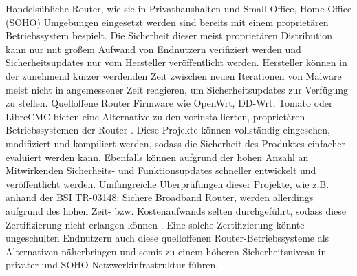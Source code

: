 \documentclass[a4paper]{book}
\begin{document}
\begin{large}
\begin{onehalfspace}
\newline\indent Handelsübliche Router, wie sie in Privathaushalten und Small Office, Home Office (SOHO) Umgebungen eingesetzt werden sind bereits mit einem proprietären Betriebssystem bespielt. Die Sicherheit dieser meist proprietären Distribution kann nur mit großem Aufwand von Endnutzern verifiziert werden und Sicherheitsupdates nur vom Hersteller veröffentlicht werden. Hersteller können in der zunehmend kürzer werdenden Zeit zwischen neuen Iterationen von Malware meist nicht in angemessener Zeit reagieren, um Sicherheitsupdates zur Verfügung zu stellen. Quelloffene Router Firmware wie OpenWrt, DD-Wrt, Tomato oder \mbox LibreCMC bieten eine Alternative zu den vorinstallierten, proprietären Betriebssystemen der Router \cite{OpenWrtWebseite.,DDWRTWebseite.,AdvancedTomatoWebseite.,libreCMCWebseite.}. Diese Projekte können vollständig eingesehen, modifiziert und kompiliert werden, sodass die Sicherheit des Produktes einfacher evaluiert werden kann. Ebenfalls können aufgrund der hohen Anzahl an Mitwirkenden Sicherheits- und Funktionsupdates \mbox schneller entwickelt und veröffentlicht werden. Umfangreiche Überprüfungen dieser Projekte, wie z.B. anhand der BSI TR-03148: Sichere Broadband Router, werden allerdings aufgrund des hohen Zeit- bzw. Kostenaufwands selten durchgeführt, sodass diese Zertifizierung nicht erlangen können \cite{BundesamtfurSicherheitinderInformationstechnik.2020b}. Eine solche Zertifizierung könnte ungeschulten Endnutzern auch diese quelloffenen Router-Betriebssysteme als Alternativen näherbringen und somit zu einem höheren Sicherheitsniveau in privater und SOHO Netzwerkinfrastruktur führen.

\end{onehalfspace}



\end{large}
\end{document}

